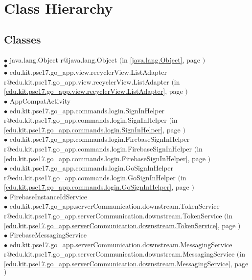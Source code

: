 \documentclass[11pt,a4paper]{report}
\makeatletter
\newcommand{\refdefined}[1]{
\expandafter\ifx\csname r@#1\endcsname\relax
\relax\else
{$($in \ref{#1}, page \pageref{#1}$)$}\fi}
\makeatother
\begin{document}
\section*{Class Hierarchy}{
\thispagestyle{empty}
\subsection*{Classes}
{\raggedright
\hspace{0.0cm} $\bullet$ java.lang.Object {\tiny \refdefined{java.lang.Object}} \\
\hspace{1.0cm} $\bullet$  {\tiny } \\
\hspace{2.0cm} $\bullet$ edu.kit.pse17.go\_app.view.recyclerView.ListAdapter {\tiny \refdefined{edu.kit.pse17.go_app.view.recyclerView.ListAdapter}} \\
\hspace{1.0cm} $\bullet$ AppCompatActivity {\tiny } \\
\hspace{2.0cm} $\bullet$ edu.kit.pse17.go\_app.commands.login.SignInHelper {\tiny \refdefined{edu.kit.pse17.go_app.commands.login.SignInHelper}} \\
\hspace{3.0cm} $\bullet$ edu.kit.pse17.go\_app.commands.login.FirebaseSignInHelper {\tiny \refdefined{edu.kit.pse17.go_app.commands.login.FirebaseSignInHelper}} \\
\hspace{3.0cm} $\bullet$ edu.kit.pse17.go\_app.commands.login.GoSignInHelper {\tiny \refdefined{edu.kit.pse17.go_app.commands.login.GoSignInHelper}} \\
\hspace{1.0cm} $\bullet$ FirebaseInstanceIdService {\tiny } \\
\hspace{2.0cm} $\bullet$ edu.kit.pse17.go\_app.serverCommunication.downstream.TokenService {\tiny \refdefined{edu.kit.pse17.go_app.serverCommunication.downstream.TokenService}} \\
\hspace{1.0cm} $\bullet$ FirebaseMessagingService {\tiny } \\
\hspace{2.0cm} $\bullet$ edu.kit.pse17.go\_app.serverCommunication.downstream.MessagingService {\tiny \refdefined{edu.kit.pse17.go_app.serverCommunication.downstream.MessagingService}} \\
}}
\end{document}
